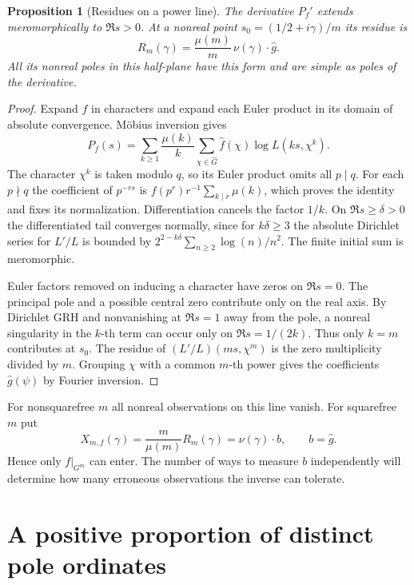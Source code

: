 \documentclass[11pt]{article}
\newtheorem{proposition}[theorem]{Proposition}
\begin{document}
\begin{proposition}[Residues on a power line]\label{prop:layer}
The derivative $P_f'$ extends meromorphically to $\Re s>0$.
At a nonreal point $s_0=(1/2+i\gamma)/m$ its residue is
\begin{equation}\label{eq:res}
 R_m(\gamma)=\frac{\mu(m)}{m}\,\nu(\gamma)\cdot\widehat g .
\end{equation}
All its nonreal poles in this half-plane have this form and are simple as poles of the derivative.
\end{proposition}

\begin{proof}
Expand $f$ in characters and expand each Euler product in its domain of absolute convergence. M\"obius inversion gives
\[
 P_f(s)=\sum_{k\ge1}\frac{\mu(k)}k
       \sum_{\chi\in\widehat G}\widehat f(\chi)\log L(ks,\chi^k).
\]
The character $\chi^k$ is taken modulo $q$, so its Euler product omits all $p\mid q$. For each $p\nmid q$ the coefficient of $p^{-rs}$ is $f(p^r)r^{-1}\sum_{k\mid r}\mu(k)$, which proves the identity and fixes its normalization. Differentiation cancels the factor $1/k$. On $\Re s\ge\delta>0$ the differentiated tail converges normally, since for $k\delta\ge3$ the absolute Dirichlet series for $L'/L$ is bounded by $2^{2-k\delta}\sum_{n\ge2}\log(n)/n^2$. The finite initial sum is meromorphic.

Euler factors removed on inducing a character have zeros on $\Re s=0$. The principal pole and a possible central zero contribute only on the real axis. By Dirichlet GRH and nonvanishing at $\Re s=1$ away from the pole, a nonreal singularity in the $k$-th term can occur only on $\Re s=1/(2k)$. Thus only $k=m$ contributes at $s_0$. The residue of $(L'/L)(ms,\chi^m)$ is the zero multiplicity divided by $m$. Grouping $\chi$ with a common $m$-th power gives the coefficients $\widehat g(\psi)$ by Fourier inversion.
\end{proof}

For nonsquarefree $m$ all nonreal observations on this line vanish. For squarefree $m$ put
\begin{equation}\label{eq:X}
 X_{m,f}(\gamma)=\frac{m}{\mu(m)}R_m(\gamma)
       =\nu(\gamma)\cdot b,\qquad b=\widehat g .
\end{equation}
Hence only $f|_{G^m}$ can enter. The number of ways to measure $b$ independently will determine how many erroneous observations the inverse can tolerate.

\section{A positive proportion of distinct pole ordinates}
\label{sec:positive-proportion}
\end{document}
